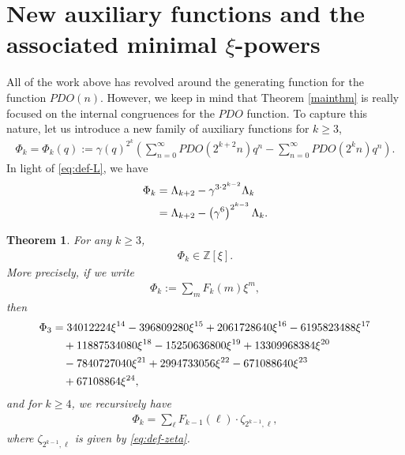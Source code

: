 \documentclass[12pt,reqno]{amsart}
\numberwithin{equation}{section}
\theoremstyle{theorem}
\newtheorem{theorem}{Theorem}
\theoremstyle{definition}
\begin{document}
\section{New auxiliary functions and the associated minimal $\xi$-powers}\label{sec:new-aux-fnc}


All of the work above has revolved around the generating function for the function $PDO(n)$. However, we keep in mind that Theorem \ref{mainthm} is really focused on the internal congruences for the $PDO$ function. To capture this nature, let us introduce a new family of auxiliary functions for $k\ge 3$,
\begin{align*}
    \Phi_k=\Phi_k(q):=\gamma(q)^{2^{k}}\left(\sum_{n=0}^\infty PDO(2^{k+2}n)q^n - \sum_{n=0}^\infty PDO(2^{k}n)q^n\right).
\end{align*}
In light of \eqref{eq:def-L}, we have
\begin{align*} %
	\Phi_k &= \Lambda_{k+2} - \gamma^{3\cdot 2^{k-2}} \Lambda_k\notag\\
    &= \Lambda_{k+2} - \left(\gamma^6 \right)^{ 2^{k-3}} \Lambda_k.
\end{align*}

\begin{theorem}\label{th:F-xi}
	For any $k\ge 3$,
	\begin{align} \label{eq:Fk-xi-poly}
		\Phi_k \in \mathbb{Z}[\xi].
	\end{align}
	More precisely, if we write
	\begin{align}\label{eq:Fk-xi}
		\Phi_k:=\sum_{m} F_k(m)\xi^m,
	\end{align}
	then
	\begin{align}\label{eq:F1-xi}
		\Phi_3 &= 34012224 \xi^{14} - 396809280 \xi^{15} + 2061728640 \xi^{16} - 6195823488 \xi^{17}\notag\\
		&\quad + 11887534080 \xi^{18} - 15250636800 \xi^{19} + 13309968384 \xi^{20}\notag\\
		&\quad  - 7840727040 \xi^{21} + 2994733056 \xi^{22} - 671088640 \xi^{23}\notag\\
		&\quad  + 67108864 \xi^{24},
	\end{align}
	and for $k\ge 4$, we recursively have
	\begin{align}\label{eq:F-xi-rec}
		\Phi_k = \sum_{\ell} F_{k-1}(\ell) \cdot \zeta_{2^{k-1},\ell},
	\end{align}
	where $\zeta_{2^{k-1},\ell}$ is given by \eqref{eq:def-zeta}.
\end{theorem}
\end{document}
